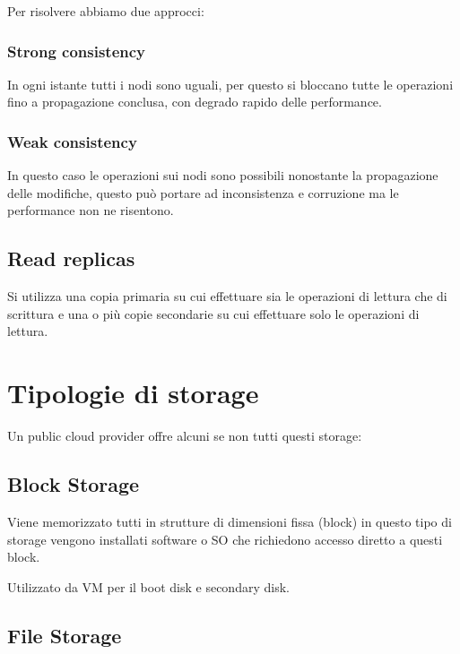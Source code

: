 Per risolvere abbiamo due approcci:

\subsubsection{Strong consistency}\label{strong-consistency}

In ogni istante tutti i nodi sono uguali, per questo si bloccano tutte
le operazioni fino a propagazione conclusa, con degrado rapido delle
performance.

\subsubsection{Weak consistency}\label{weak-consistency}

In questo caso le operazioni sui nodi sono possibili nonostante la
propagazione delle modifiche, questo può portare ad inconsistenza e
corruzione ma le performance non ne risentono.

\subsection{Read replicas}\label{read-replicas}

Si utilizza una copia primaria su cui effettuare sia le operazioni di
lettura che di scrittura e una o più copie secondarie su cui effettuare
solo le operazioni di lettura.

\section{Tipologie di storage}\label{tipologie-di-storage}

Un public cloud provider offre alcuni se non tutti questi storage:

\subsection{Block Storage}\label{block-storage}

Viene memorizzato tutti in strutture di dimensioni fissa (block) in
questo tipo di storage vengono installati software o SO che richiedono
accesso diretto a questi block.

Utilizzato da VM per il boot disk e secondary disk.

\subsection{File Storage}\label{file-storage}

